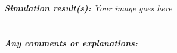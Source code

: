 \textit{\textbf{Simulation result(s):}} \textit{Your image goes here}\\
\\
\vspace{8cm}
\\
\textbf{\textit{Any comments or explanations:}}
\dotfill\bigskip\par\mbox{}\dotfill
\dotfill\bigskip\par\mbox{}\dotfill
\dotfill\bigskip\par\mbox{}\dotfill
\dotfill\bigskip\par\mbox{}\dotfill
\dotfill\bigskip\par\mbox{}\dotfill
\dotfill\bigskip\par\mbox{}\dotfill
\\
\\

